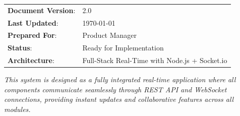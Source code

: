 \documentclass[11pt,a4paper]{article}
\begin{document}
\vspace{1cm}

\begin{center}
\begin{tabular}{ll}
\textbf{Document Version}: & 2.0 \\
\textbf{Last Updated}: & \today \\
\textbf{Prepared For}: & Product Manager \\
\textbf{Status}: & Ready for Implementation \\
\textbf{Architecture}: & Full-Stack Real-Time with Node.js + Socket.io
\end{tabular}
\end{center}

\vspace{0.5cm}

\begin{center}
\textit{This system is designed as a fully integrated real-time application where all components communicate seamlessly through REST API and WebSocket connections, providing instant updates and collaborative features across all modules.}
\end{center}
\end{document}
